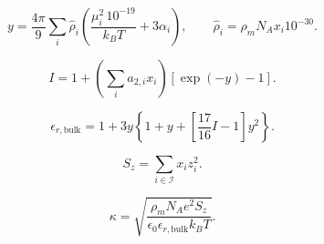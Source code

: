 \documentclass[11pt]{article}
\begin{document}
\begin{equation}
y=\frac{4\pi}{9}\sum_i \widehat{\rho}_i
\left(\frac{\mu_i^2\,10^{-19}}{k_BT}+3\alpha_i\right),
\qquad
\widehat{\rho}_i=\rho_mN_Ax_i10^{-30}.
\label{eq:effective_dipolar_density}
\end{equation}

\begin{equation}
I=1+\left(\sum_i a_{2,i}x_i\right)\left[\exp(-y)-1\right].
\label{eq:dipolar_correlation_integral}
\end{equation}

\begin{equation}
\epsilon_{r,\mathrm{bulk}}=
1+3y\left\{1+y+\left[\frac{17}{16}I-1\right]y^2\right\}.
\label{eq:dipolar_perturbation_bulk_permittivity}
\end{equation}

\begin{equation}
S_z=\sum_{i\in\mathcal{I}}x_i z_i^2.
\label{eq:ionic_strength_charge_sum}
\end{equation}

\begin{equation}
\kappa=
\sqrt{\frac{\rho_mN_Ae^2S_z}
{\epsilon_0\epsilon_{r,\mathrm{bulk}}k_BT}}.
\label{eq:debye_screening_parameter}
\end{equation}
\end{document}
